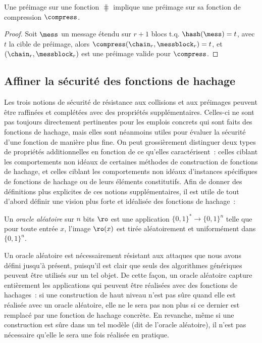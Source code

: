 \begin{prop}
Une préimage sur une fonction \merkdam $\hash$ implique une préimage sur sa fonction de compression
$\compress$.
\end{prop}
\begin{proof}
Soit 
$\mess$ un message étendu sur  $r+1$ blocs t.q. $\hash(\mess) = t$, avec $t$ la cible de préimage, alors
$\compress(\chain_r, \messblock_r) = t$, et $(\chain_r, \messblock_r)$ est une préimage valide pour $\compress$.
\end{proof}

\subsection{Affiner la sécurité des fonctions de hachage\label{sec:frefmd}}

Les trois notions de sécurité de résistance aux collisions et aux préimages peuvent être raffinées et complétées avec des propriétés supplémentaires.
Celles-ci ne sont pas toujours directement pertinentes pour les emplois concrets qui sont faits des fonctions de hachage, mais elles sont néanmoins
utiles pour évaluer la sécurité d'une fonction de manière plus fine.
On peut grossièrement distinguer deux types de propriétés additionnelles en fonction de ce qu'elles caractérisent~: celles ciblant les comportements
non idéaux de certaines méthodes de construction de fonctions de hachage, et celles ciblant les comportements
non idéaux d'instances spécifiques de fonctions de hachage ou de leurs éléments constitutifs.
Afin de donner des définitions plus explicites de ces notions supplémentaires, il est utile de tout d'abord définir une vision plus forte et idéalisée des
fonctions de hachage~: 

\begin{fdefi}
Un \emph{oracle aléatoire} sur $n$ bits
$\ro$ est une application $\{0,1\}^* \rightarrow \{0,1\}^n$ telle que pour toute entrée $x$,
l'image $\ro(x)$ est tirée aléatoirement et uniformément dans $\{0,1\}^n$.
\end{fdefi}

Un oracle aléatoire est nécessairement résistant aux attaques que nous avons défini jusqu'à présent, puisqu'il est clair
que seuls des algorithmes génériques peuvent être utilisés sur un tel objet. De cette façon, un oracle aléatoire capture
entièrement les applications qui peuvent être réalisées avec des fonctions de hachages~: si une construction de haut niveau
n'est pas sûre quand elle est réalisée avec un oracle aléatoire, elle ne le sera pas non plus si ce dernier est remplacé par une fonction
de hachage concrète. En revanche, même si une construction est sûre dans un tel modèle (dit de l'oracle aléatoire), il n'est pas
nécessaire qu'elle le sera une fois réalisée en pratique.


